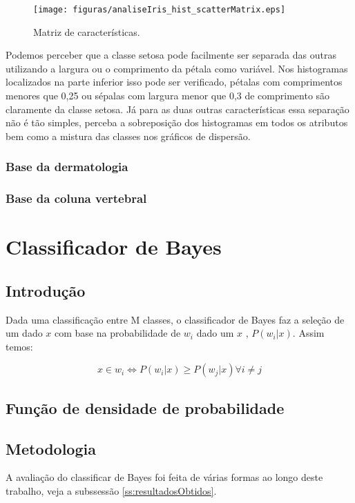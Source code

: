 \documentclass[ 
	article,			%
	11pt,				%
	oneside,			%
	a4paper,			%
	english,			%
	brazil,				%
	]{abntex2}
\begin{document}
\begin{figure}[!htb] \centering
\texttt{[image: figuras/analiseIris\_hist\_scatterMatrix.eps]}
\caption{Matriz de características.}
\label{fig:charMatrix}
\end{figure}

 Podemos perceber que a classe setosa pode facilmente ser separada das outras
 utilizando a largura ou o comprimento da pétala como variável. Nos histogramas
 localizados na parte inferior isso pode ser verificado, pétalas com
 comprimentos menores que 0,25 ou sépalas com largura menor que 0,3 de
 comprimento são claramente da classe setosa.
 Já para as duas outras características essa separação não é tão simples,
 perceba a sobreposição dos histogramas em todos os atributos bem como a mistura
 das classes nos gráficos de dispersão.
 
 \subsubsection{Base da dermatologia}
 \subsubsection{Base da coluna vertebral}



\section{Classificador de Bayes}

\subsection{Introdução}
Dada uma classificação entre M classes, o classificador de Bayes faz a seleção
de um dado $x$ com base na probabilidade de $w_i$ dado um $x$ , $P(w_i|x)$.
Assim temos:


\begin{equation}
	x \in w_i \iff P(w_i|x) \geq P(w_j|x) \forall i \neq j
\end{equation}

\subsection{Função de densidade de probabilidade}
 
\subsection{Metodologia}
\label{ss:metAplbayes}
A avaliação do classificar de Bayes foi feita de várias formas ao longo deste
trabalho, veja a subssessão \ref{ss:resultadosObtidos}. 
\end{document}
